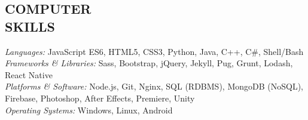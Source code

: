 \documentclass[line,margin]{res}
\begin{document}
\begin{resume}
\section{COMPUTER \\ SKILLS} {\sl Languages:} 
				JavaScript ES6, HTML5, CSS3, Python, Java, 
				C++, C\#, Shell/Bash \\
                {\sl Frameworks \& Libraries:}
                Sass, Bootstrap, jQuery, Jekyll, Pug, Grunt, Lodash, React Native\\
                {\sl Platforms \& Software:}
                Node.js, Git, Nginx, SQL (RDBMS), MongoDB (NoSQL), Firebase, Photoshop, After Effects, Premiere, Unity\\
                {\sl Operating Systems:}
                Windows, Linux, Android
                

\end{resume}
\end{document}
